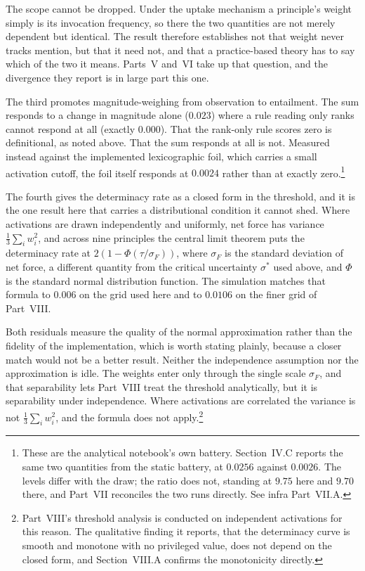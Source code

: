 The scope cannot be dropped. Under the uptake mechanism a principle's weight
simply is its invocation frequency, so there the two quantities are not merely
dependent but identical. The result therefore establishes not that
weight never tracks mention, but that it need not, and that a practice-based
theory has to say which of the two it means. Parts~V and~VI take up that
question, and the divergence they report is in large part this one.

The third promotes magnitude-weighing from observation to entailment. The sum
responds to a change in magnitude alone ($0.023$) where a rule reading only
ranks cannot respond at all (exactly $0.000$). That the rank-only rule scores
zero is definitional, as noted above. That the sum responds at all is not. Measured
instead against the implemented lexicographic foil, which carries a small
activation cutoff, the foil itself responds at $0.0024$ rather than at exactly
zero.\footnote{These are the analytical notebook's own battery. Section~IV.C reports the same
two quantities from the static battery, at $0.0256$ against $0.0026$. The
levels differ with the draw; the ratio does not, standing at $9.75$ here and
$9.70$ there, and Part~VII reconciles the two runs directly. See infra
Part~VII.A.}

The fourth gives the determinacy rate as a closed form in the threshold, and
it is the one result here that carries a distributional condition it cannot
shed. Where activations are drawn independently and uniformly, net force has
variance $\tfrac{1}{3}\sum_i w_i^2$, and across nine principles the central
limit theorem puts the determinacy rate at $2(1 - \Phi(\tau/\sigma_F))$, where
$\sigma_F$ is the standard deviation of net force, a different quantity from
the critical uncertainty $\sigma^{*}$ used above, and $\Phi$ is the standard
normal distribution function. The
simulation matches that formula to $0.006$ on the grid used here and to
$0.0106$ on the finer grid of Part~VIII.

Both residuals measure the quality of the normal approximation rather than the
fidelity of the implementation, which is worth stating plainly, because a
closer match would not be a better result. Neither the independence assumption
nor the approximation is idle. The weights enter only through the single scale $\sigma_F$, and that
separability lets Part~VIII treat the threshold analytically, but it is separability under independence. Where activations are
correlated the variance is not $\tfrac{1}{3}\sum_i w_i^2$, and the formula
does not apply.\footnote{Part~VIII's threshold analysis is conducted on
independent activations for this reason. The qualitative finding it reports,
that the determinacy curve is smooth and monotone with no privileged value,
does not depend on the closed form, and Section~VIII.A confirms the
monotonicity directly.}

